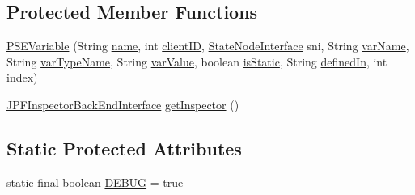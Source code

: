 \subsection*{Protected Member Functions}
\begin{DoxyCompactItemize}
\item 
\hyperlink{classgov_1_1nasa_1_1jpf_1_1inspector_1_1common_1_1pse_1_1_p_s_e_variable_afd22253d20835f412df56b43a8a3352a}{P\+S\+E\+Variable} (String \hyperlink{classgov_1_1nasa_1_1jpf_1_1inspector_1_1common_1_1pse_1_1_program_state_entry_a5fbdd37745a66317f1ea7738c3bda2a6}{name}, int \hyperlink{classgov_1_1nasa_1_1jpf_1_1inspector_1_1common_1_1pse_1_1_program_state_entry_a5743d1d799e3e1e864755f1040da1962}{client\+ID}, \hyperlink{interfacegov_1_1nasa_1_1jpf_1_1inspector_1_1server_1_1programstate_1_1_state_node_interface}{State\+Node\+Interface} sni, String \hyperlink{classgov_1_1nasa_1_1jpf_1_1inspector_1_1common_1_1pse_1_1_p_s_e_variable_ab22ccad7c4981bcadd0ddf2df3337689}{var\+Name}, String \hyperlink{classgov_1_1nasa_1_1jpf_1_1inspector_1_1common_1_1pse_1_1_p_s_e_variable_a646062a613747f6813b99f010f361222}{var\+Type\+Name}, String \hyperlink{classgov_1_1nasa_1_1jpf_1_1inspector_1_1common_1_1pse_1_1_p_s_e_variable_a898c9a245ba0da48961a76a29c8ee8b3}{var\+Value}, boolean \hyperlink{classgov_1_1nasa_1_1jpf_1_1inspector_1_1common_1_1pse_1_1_p_s_e_variable_ad4f7133731afc14a4680c1928e960942}{is\+Static}, String \hyperlink{classgov_1_1nasa_1_1jpf_1_1inspector_1_1common_1_1pse_1_1_p_s_e_variable_a2dd10359feb7e7fcf3a6f93c32b76c03}{defined\+In}, int \hyperlink{classgov_1_1nasa_1_1jpf_1_1inspector_1_1common_1_1pse_1_1_p_s_e_variable_aa1c82f7362843f3926328cb30c5067cd}{index})
\item 
\hyperlink{interfacegov_1_1nasa_1_1jpf_1_1inspector_1_1interfaces_1_1_j_p_f_inspector_back_end_interface}{J\+P\+F\+Inspector\+Back\+End\+Interface} \hyperlink{classgov_1_1nasa_1_1jpf_1_1inspector_1_1common_1_1pse_1_1_program_state_entry_ab04eadea7420b70405969a6b95656411}{get\+Inspector} ()
\end{DoxyCompactItemize}
\subsection*{Static Protected Attributes}
\begin{DoxyCompactItemize}
\item 
static final boolean \hyperlink{classgov_1_1nasa_1_1jpf_1_1inspector_1_1common_1_1pse_1_1_program_state_entry_a84ef5e9f23ec651d7a67a8ee72819b0e}{D\+E\+B\+UG} = true
\end{DoxyCompactItemize}

